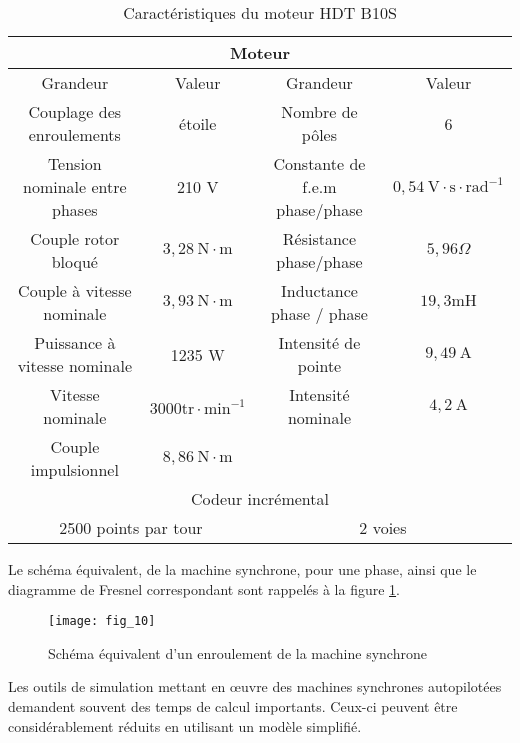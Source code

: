\begin{table}
\centering
\begin{tabular}{|c|c|c|c|}
\hline
\multicolumn{4}{|c|}{Moteur} \\
\hline
Grandeur & Valeur & Grandeur & Valeur  \\
\hline
Couplage des enroulements & étoile & Nombre de pôles & 6  \\
\hline
Tension nominale entre phases & 210 V & Constante de f.e.m phase/phase & $0,54 \mathrm{~V} \cdot \mathrm{s} \cdot \mathrm{rad}^{-1}$  \\
\hline
Couple rotor bloqué & $3,28 \mathrm{~N} \cdot \mathrm{m}$ & Résistance phase/phase & $5,96 \Omega$   \\
\hline
Couple à vitesse nominale & $3,93 \mathrm{~N} \cdot \mathrm{m}$ & Inductance phase $/$ phase & $19,3 \mathrm{mH}$   \\
\hline
Puissance à vitesse nominale & 1235 W & Intensité de pointe & $9,49 \mathrm{~A}$ \\
\hline
Vitesse nominale & $3000 \mathrm{tr} \cdot \mathrm{min}^{-1}$ & Intensité nominale & $4,2 \mathrm{~A}$ \\
\hline
Couple impulsionnel & $8,86 \mathrm{~N} \cdot \mathrm{m}$ &  &   \\
\hline
\multicolumn{4}{|c|}{Codeur incrémental} \\
\hline
\multicolumn{2}{|c|}{2500 points par tour} &  \multicolumn{2}{|c|}{2 voies}  \\
\hline
\end{tabular}

\caption{\label{tab:CCS_TSI_2021_tab_03}Caractéristiques du moteur HDT B10S}
\end{table}

Le schéma équivalent, de la machine synchrone, pour une phase, ainsi que le diagramme de Fresnel correspondant sont rappelés à la figure \ref{fig:CCS_TSI_2021_fig_10}.\\

\begin{figure}
\centering
\texttt{[image: fig\_10]}
\caption{\label{fig:CCS_TSI_2021_fig_10}Schéma équivalent d'un enroulement de la machine synchrone}
\end{figure}

Les outils de simulation mettant en œuvre des machines synchrones autopilotées demandent souvent des temps de calcul importants. Ceux-ci peuvent être considérablement réduits en utilisant un modèle simplifié.

